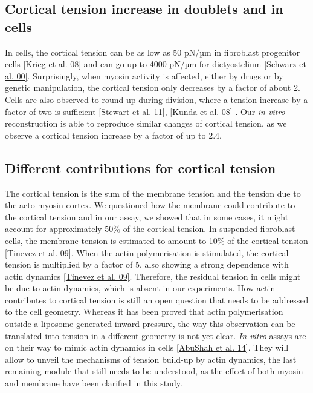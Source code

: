 \documentclass[A4paperpaper,11pt,english]{sphinxmanual}
\begin{document}
\subsection{Cortical tension increase in doublets and in cells}
\label{index-latex:cortical-tension-increase-in-doublets-and-in-cells}
In cells, the cortical tension can be as low as 50 pN/µm in fibroblast progenitor
cells {\hyperref[index-latex:krieg2008]{{[}Krieg et al. 08{]}}} and can go up to 4000 pN/µm for
dictyostelium {\hyperref[index-latex:schwarz2000]{{[}Schwarz et al. 00{]}}}. Surprisingly, when myosin activity is
affected, either by drugs or by genetic manipulation, the cortical tension only
decreases by a factor of about 2. Cells are also observed to round up during
division, where a  tension increase by a factor of two
is sufficient {\hyperref[index-latex:stewart2011]{{[}Stewart et al. 11{]}}}, {\hyperref[index-latex:kunda2008]{{[}Kunda et al. 08{]}}} .
Our \emph{in vitro} reconstruction is able to reproduce similar
changes of cortical tension, as we observe a cortical tension increase by a factor of up to 2.4.


\subsection{Different contributions for cortical tension}
\label{index-latex:different-contributions-for-cortical-tension}
The cortical tension is the sum of the membrane tension and the tension due to the
acto myosin cortex. We questioned how the membrane could contribute to the cortical tension
and in our assay, we showed that in some cases, it might account for approximately 50\% of the cortical tension.
In suspended fibroblast cells, the membrane tension is estimated to amount to 10\% of the
cortical tension {\hyperref[index-latex:tinevez2009]{{[}Tinevez et al. 09{]}}}. When the actin polymerisation is
stimulated, the cortical tension is multiplied by a factor of 5, also showing a
strong dependence with actin dynamics {\hyperref[index-latex:tinevez2009]{{[}Tinevez et al. 09{]}}}. Therefore, the
residual tension in cells might be due to actin dynamics, which is absent in our
experiments. How actin contributes to cortical tension is still an open question
that needs to be addressed to the cell geometry.  Whereas it has been proved that actin polymerisation
outside a liposome generated inward pressure,
the way this observation can be translated into tension  in a different geometry is
not yet clear. \emph{In vitro} assays are on their way to mimic actin dynamics in
cells {\hyperref[index-latex:abushah2014]{{[}AbuShah et al. 14{]}}}. They will allow to unveil the mechanisms of tension build-up by
actin dynamics, the last remaining module that still needs to be understood,
as the effect of both myosin and membrane have been clarified in this study.
\end{document}
